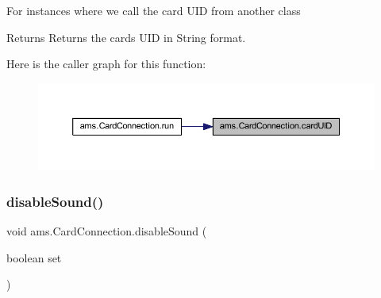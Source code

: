 For instances where we call the card U\+ID from another class \begin{DoxyReturn}{Returns}
Returns the card\textquotesingle{}s U\+ID in String format. 
\end{DoxyReturn}
Here is the caller graph for this function\+:\nopagebreak
\begin{figure}[H]
\begin{center}
\leavevmode
\includegraphics[width=350pt]{classams_1_1_card_connection_a25b0ff4c7b137be761f2814ef1dcaba7_icgraph}
\end{center}
\end{figure}
\mbox{\label{classams_1_1_card_connection_a9e20e93963b78e6b960dfdd5166504bb}} 
\subsubsection{\texorpdfstring{disableSound()}{disableSound()}}
{\footnotesize\ttfamily void ams.\+Card\+Connection.\+disable\+Sound (\begin{DoxyParamCaption}\item[{boolean}]{set }\end{DoxyParamCaption})}

